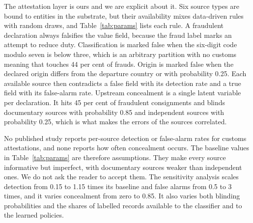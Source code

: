 \documentclass[information,article,submit,moreauthors]{Definitions/mdpi}
\begin{document}
The attestation layer is ours and we are explicit about it. Six source types are bound to entities in the substrate, but their availability mixes data-driven rules with random draws, and Table~\ref{tab:params} lists each rule. A fraudulent declaration always falsifies the value field, because the fraud label marks an attempt to reduce duty. Classification is marked false when the six-digit code modulo seven is below three, which is an arbitrary partition with no customs meaning that touches 44 per cent of frauds. Origin is marked false when the declared origin differs from the departure country or with probability 0.25. Each available source then contradicts a false field with its detection rate and a true field with its false-alarm rate. Upstream concealment is a single latent variable per declaration. It hits 45 per cent of fraudulent consignments and blinds documentary sources with probability 0.85 and independent sources with probability 0.25, which is what makes the errors of the sources correlated.

No published study reports per-source detection or false-alarm rates for customs attestations, and none reports how often concealment occurs. The baseline values in Table~\ref{tab:params} are therefore assumptions. They make every source informative but imperfect, with documentary sources weaker than independent ones. We do not ask the reader to accept them. The sensitivity analysis scales detection from 0.15 to 1.15 times its baseline and false alarms from 0.5 to 3 times, and it varies concealment from zero to 0.85. It also varies both blinding probabilities and the shares of labelled records available to the classifier and to the learned policies.
\end{document}
